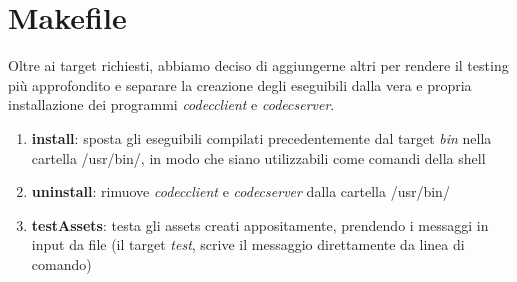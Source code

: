 \documentclass[a4paper,9pt]{article}
\begin{document}
\section{Makefile}
Oltre ai target richiesti, abbiamo deciso di aggiungerne altri per rendere il testing più approfondito e separare la creazione degli eseguibili dalla vera e propria installazione dei programmi \emph{codecclient} e \emph{codecserver}.
\begin{enumerate}
\item \textbf{install}: sposta gli eseguibili compilati precedentemente dal target \emph{bin} nella cartella /usr/bin/, in modo che siano utilizzabili come comandi della shell
\item \textbf{uninstall}: rimuove \emph{codecclient} e \emph{codecserver} dalla cartella /usr/bin/
\item \textbf{testAssets}: testa gli assets creati appositamente, prendendo i messaggi in input da file (il target \emph{test}, scrive il messaggio direttamente da linea di comando)
\end{enumerate} 
\end{document}
